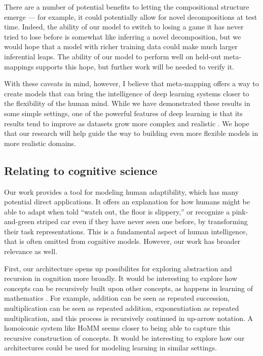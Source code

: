 There are a number of potential benefits to letting the compositional structure emerge --- for example, it could potentially allow for novel decompositions at test time. Indeed, the ability of our model to switch to losing a game it has never tried to lose before is somewhat like inferring a novel decomposition, but we would hope that a model with richer training data could make much larger inferential leaps. The ability of our model to perform well on held-out meta-mappings supports this hope, but further work will be needed to verify it. \par

With these caveats in mind, however, I believe that meta-mapping offers a way to create models that can bring the intelligence of deep learning systems closer to the flexibility of the human mind. While we have demonstrated these results in some simple settings, one of the powerful features of deep learning is that its results tend to improve as datasets grow more complex and realistic \citep{Hill2019a,Radford2019}. We hope that our research will help guide the way to building even more flexible models in more realistic domains.  \par

\subsection{Relating to cognitive science}

Our work provides a tool for modeling human adaptibility, which has many potential direct applications. It offers an explanation for how humans might be able to adapt when told ``watch out, the floor is slippery,'' or recognize a pink-and-green striped car even if they have never seen one before, by transforming their task representations. This is a fundamental aspect of human intelligence, that is often omitted from cognitive models. However, our work has broader relevance as well. \par 

First, our architecture opens up possibilites for exploring abstraction and recursion in cognition more broadly. It would be interesting to explore how concepts can be recursively built upon other concepts, as happens in learning of mathematics \citep{Wilensky1991, Hazzan1999, Lampinen2017b}. For example, addition can be seen as repeated succession, multiplication can be seen as repeated addition, exponentiation as repeated multiplication, and this process is recursively continued in up-arrow notation. A homoiconic system like HoMM seems closer to being able to capture this recursive construction of concepts. It would be interesting to explore how our architectures could be used for modeling learning in similar settings. \par 

